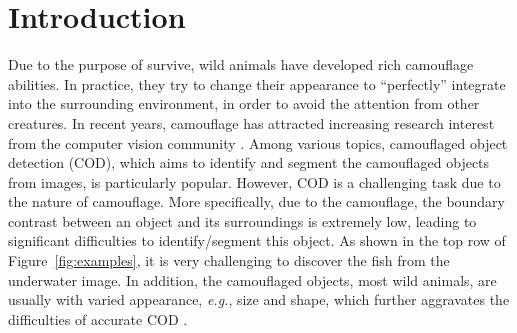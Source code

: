 \documentclass{article}
\def\eg{\emph{e.g.}}
\begin{document}
\section{Introduction}
Due to the purpose of survive, wild animals have developed rich camouflage abilities.
In practice, they try to change their appearance to ``perfectly'' integrate into the surrounding environment, in order to avoid the attention from other creatures.
In recent years, camouflage has attracted increasing research interest from the computer vision community \cite{anet,fan2021concealed,Lyu2021,mei2021Ming,zhai2021Mutual}.
Among various topics, camouflaged object detection (COD), which aims to identify and segment the camouflaged objects from images, is particularly popular.
However, COD is a challenging task due to the nature of camouflage. More specifically, due to the camouflage, the boundary contrast between an object and its surroundings is extremely low, leading to significant difficulties to identify/segment this object. As shown in the top row of Figure~\ref{fig:examples}, it is very challenging to discover the fish from the underwater image.
In addition, the camouflaged objects, most wild animals, are usually with varied appearance, \eg, size and shape, which further aggravates the difficulties of accurate COD \cite{anet,fan2021concealed}.
\end{document}
